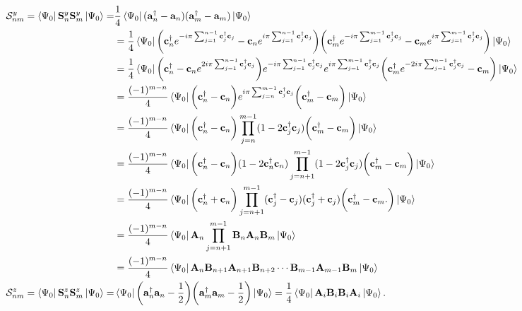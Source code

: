 \documentclass{homework}
\begin{document}
\begin{equation}
    \begin{split}
        \mathcal{S}_{nm}^y = \bra{\Psi_0} \spin_n^y \spin_m^y \ket{\Psi_0} =& \frac{1}{4} \bra{\Psi_0} ({\bf a}_n^\dagger - {\bf a}_n)({\bf a}_m^\dagger - {\bf a}_m) \ket{\Psi_0}\\
        &= \frac{1}{4} \bra{\Psi_0} \bigg({\bf c}_n^\dagger e^{-i\pi \sum_{j = 1}^{n-1} {\bf c}_j^\dagger {\bf c}_j} - {\bf c}_n e^{i\pi \sum_{j = 1}^{n-1} {\bf c}_j^\dagger {\bf c}_j}\bigg) \bigg({\bf c}_m^\dagger e^{-i\pi \sum_{j = 1}^{m-1} {\bf c}_j^\dagger {\bf c}_j} - {\bf c}_m e^{i\pi \sum_{j = 1}^{m-1} {\bf c}_j^\dagger {\bf c}_j} \bigg)\ket{\Psi_0} \\
            &= \frac{1}{4} \bra{\Psi_0} \bigg({\bf c}_n^\dagger - {\bf c}_n e^{2i\pi \sum_{j = 1}^{n-1} {\bf c}_j^\dagger {\bf c}_j} \bigg) e^{-i\pi \sum_{j = 1}^{n-1} {\bf c}_j^\dagger {\bf c}_j} e^{i\pi \sum_{j = 1}^{m-1} {\bf c}_j^\dagger {\bf c}_j} \bigg({\bf c}_m^\dagger e^{-2i\pi \sum_{j = 1}^{n-1} {\bf c}_j^\dagger {\bf c}_j} - {\bf c}_m \bigg)\ket{\Psi_0}\\
            &= \frac{(-1)^{m-n}}{4} \bra{\Psi_0} \bigg({\bf c}_n^\dagger - {\bf c}_n\bigg) e^{i\pi \sum_{j = n}^{m-1} {\bf c}_j^\dagger {\bf c}_j} \bigg({\bf c}_m^\dagger - {\bf c}_m \bigg)\ket{\Psi_0}\\
            &= \frac{(-1)^{m-n}}{4} \bra{\Psi_0} \bigg({\bf c}_n^\dagger - {\bf c}_n\bigg) \prod_{j=n}^{m-1} ({1-2{\bf c}_j^\dagger {\bf c}_j}) \bigg({\bf c}_m^\dagger - {\bf c}_m \bigg)\ket{\Psi_0} \\
            &= \frac{(-1)^{m-n}}{4} \bra{\Psi_0} \bigg({\bf c}_n^\dagger - {\bf c}_n\bigg) ({1-2{\bf c}_n^\dagger {\bf c}_n}) \prod_{j=n+1}^{m-1} ({1-2{\bf c}_j^\dagger {\bf c}_j}) \bigg({\bf c}_m^\dagger - {\bf c}_m \bigg)\ket{\Psi_0} \\
            &= \frac{(-1)^{m-n}}{4} \bra{\Psi_0} \bigg({\bf c}_n^\dagger + {\bf c}_n\bigg) \prod_{j=n+1}^{m-1} ({\bf c}_j^\dagger - {\bf c}_j)({\bf c}_j^\dagger + {\bf c}_j) \bigg({\bf c}_m^\dagger - {\bf c}_m. \bigg)\ket{\Psi_0} \\
            &= \frac{(-1)^{m-n}}{4} \bra{\Psi_0} {{\bf A}}_n \prod_{j=n+1}^{m-1} {{\bf B}}_n {{\bf A}}_n {{\bf B}}_m \ket{\Psi_0}    \\
         &= \frac{(-1)^{m-n}}{4} \bra{\Psi_0} {{\bf A}}_n {{\bf B}}_{n+1} {{\bf A}}_{n+1} {{\bf B}}_{n+2} \cdots {{\bf B}}_{m-1} {{\bf A}}_{m-1} {{\bf B}}_m \ket{\Psi_0}
        \\
         \mathcal{S}_{nm}^z = \bra{\Psi_0} \spin_n^z \spin_m^z \ket{\Psi_0} =& \bra{\Psi_0} \bigg({\bf a}_n^\dagger {\bf a}_n - \frac{1}{2}\bigg) \bigg({\bf a}_m^\dagger {\bf a}_m - \frac{1}{2}\bigg)\ket{\Psi_0} = \frac{1}{4} \bra{\Psi_0} {{\bf A}}_i {{\bf B}}_i {{\bf B}}_i {{\bf A}}_i\ket{\Psi_0}.\\
    \end{split}
\end{equation}
\end{document}
